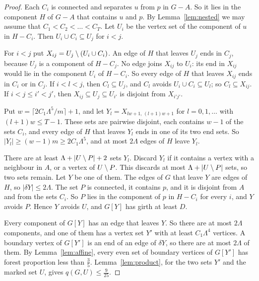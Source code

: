 \begin{proof}
Each $C_i$ is connected and separates $u$ from $p$ in $G-A$. So it lies in the component $H$ of
$G-A$ that contains $u$ and $p$. By Lemma~\ref{lem:nested} we may assume that
$C_1<C_2<\dots<C_T$. Let $U_i$ be the vertex set of the component of $u$ in $H-C_i$. Then
$U_i\cup C_i\subseteq U_j$ for $i<j$.

 For $i<j$ put $X_{ij}=U_j\setminus(U_i\cup C_i)$. An edge of $H$ that leaves $U_j$ ends
in $C_j$, because $U_j$ is a component of $H-C_j$. No edge joins $X_{ij}$ to $U_i$: its end in
$X_{ij}$ would lie in the component $U_i$ of $H-C_i$. So every edge of $H$ that leaves $X_{ij}$
ends in $C_i$ or in $C_j$. If $i<l<j$, then $C_l\subseteq U_j$, and $C_l$ avoids
$U_i\cup C_i\subseteq U_l$; so $C_l\subseteq X_{ij}$. If $i<j\le i'<j'$, then
$X_{ij}\subseteq U_j\subseteq U_{i'}$ is disjoint from $X_{i'j'}$.

Put $w=\lceil2C_1\Lambda^{5}/m\rceil+1$, and let $Y_l=X_{lw+1,\,(l+1)w+1}$ for $l=0,1,\dots$ with
$(l+1)w\le T-1$. These sets are pairwise disjoint, each contains $w-1$ of the sets $C_i$, and
every edge of $H$ that leaves $Y_l$ ends in one of its two end sets. So
$|Y_l|\ge(w-1)m\ge2C_1\Lambda^{5}$, and at most $2\Lambda$ edges of $H$ leave $Y_l$.

There are at least $\Lambda+|U\setminus P|+2$ sets $Y_l$. Discard $Y_l$ if it contains a vertex with a
neighbour in $A$, or a vertex of $U\setminus P$. This discards at most $\Lambda+|U\setminus P|$ sets, so two
sets remain. Let $Y$ be one of them. The edges of $G$ that leave $Y$ are edges of $H$, so
$|\delta Y|\le2\Lambda$. The set $P$ is connected, it contains $p$, and it is disjoint from $A$ and
from the sets $C_i$. So $P$ lies in the component of $p$ in $H-C_i$ for every $i$, and $Y$ avoids
$P$. Hence $Y$ avoids $U$, and $G[Y]$ has girth at least $D$.

 Every component of $G[Y]$ has an edge that leaves $Y$. So there are at most
$2\Lambda$ components, and one of them has a vertex set $Y'$ with at least $C_1\Lambda^{4}$
vertices. A boundary vertex of $G[Y']$ is an end of an edge of $\delta Y$, so there are at most
$2\Lambda$ of them. By Lemma~\ref{lem:affine}, every even set of boundary vertices of $G[Y']$ has
forest proportion less than $\frac35$. Lemma~\ref{lem:product}, for the two sets $Y'$ and the
marked set $U$, gives $q(G,U)\le\frac9{25}$.
\end{proof}

